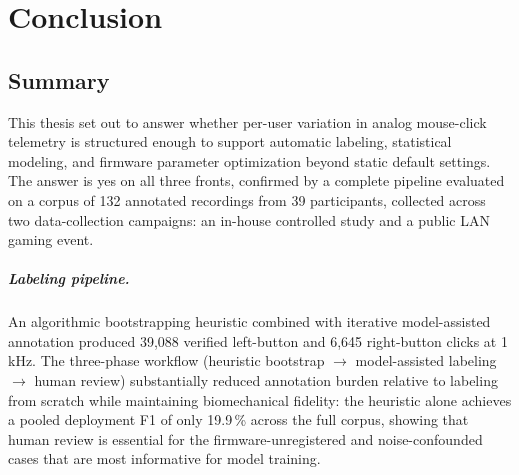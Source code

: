 \chapter{Conclusion}

\section{Summary}

This thesis set out to answer whether per-user variation in analog mouse-click
telemetry is structured enough to support automatic labeling, statistical modeling,
and firmware parameter optimization beyond static default settings.  The answer is
yes on all three fronts, confirmed by a complete pipeline evaluated on a corpus of
132 annotated recordings from 39 participants, collected across two data-collection
campaigns: an in-house controlled study and a public LAN gaming event.

\paragraph{Labeling pipeline.}
An algorithmic bootstrapping heuristic combined with iterative model-assisted
annotation produced 39,088 verified left-button and 6,645 right-button clicks
at 1\,kHz.  The three-phase workflow (heuristic bootstrap $\to$ model-assisted
labeling $\to$ human review) substantially reduced annotation burden relative to
labeling from scratch while maintaining biomechanical fidelity: the heuristic alone
achieves a pooled deployment F1 of only 19.9\,\% across the full corpus, showing that
human review is essential for the firmware-unregistered and noise-confounded cases
that are most informative for model training.

